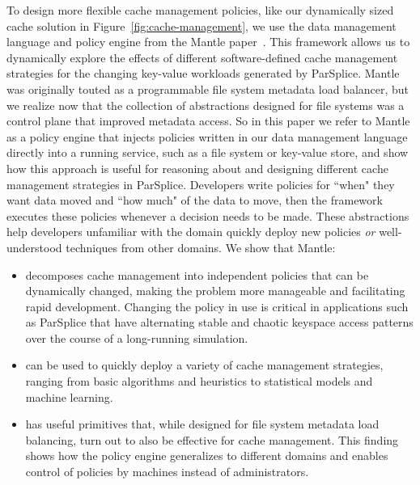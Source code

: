 To design more flexible cache management policies, like our dynamically sized
cache solution in Figure~\ref{fig:cache-management}, we use the data management
language and policy engine from the Mantle paper~\cite{sevilla:sc15-mantle}.
This framework allows us to dynamically explore the effects of different
software-defined cache management strategies for the changing key-value
workloads generated by ParSplice.  Mantle was originally touted as a
programmable file system metadata load balancer, but we realize now that the
collection of abstractions designed for file systems was a control plane that
improved metadata access. So in this paper we refer to Mantle as a policy
engine that injects policies written in our data management language directly
into a running service, such as a file system or key-value store, and show how
this approach is useful for reasoning about and designing different cache
management strategies in ParSplice.  Developers write policies for ``when" they
want data moved and ``how much" of the data to move, then the framework
executes these policies whenever a decision needs to be made.  These
abstractions help developers unfamiliar with the domain quickly deploy new
policies {\it or} well-understood techniques from other domains.  We show that
Mantle:

\begin{itemize}

  \item decomposes cache management into independent policies that can be
  dynamically changed, making the problem more manageable and facilitating rapid
  development. Changing the policy in use is critical in applications such as
  ParSplice that have alternating stable and chaotic keyspace access patterns
  over the course of a long-running simulation.  

  \item can be used to quickly deploy a variety of cache management strategies,
  ranging from basic algorithms and heuristics to statistical models and machine
  learning. 

  \item has useful primitives that, while designed for file system metadata
  load balancing, turn out to also be effective for cache management. This
  finding shows how the policy engine generalizes to different domains and
  enables control of policies by machines instead of administrators.

\end{itemize}

